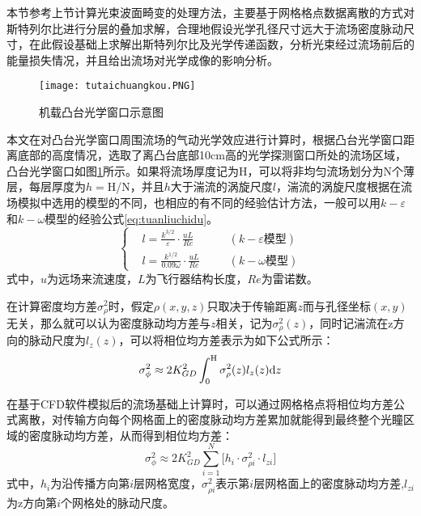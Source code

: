 本节参考上节计算光束波面畸变的处理方法，主要基于网格格点数据离散的方式对斯特列尔比进行分层的叠加求解，合理地假设光学孔径尺寸远大于流场密度脉动尺寸，在此假设基础上求解出斯特列尔比及光学传递函数，分析光束经过流场前后的能量损失情况，并且给出流场对光学成像的影响分析。

\begin{figure}[bhtp]
\centering
\texttt{[image: tutaichuangkou.PNG]}
\caption{机载凸台光学窗口示意图}
\label{fig:guangxuechaungkou}
\end{figure}

本文在对凸台光学窗口周围流场的气动光学效应进行计算时，根据凸台光学窗口距离底部的高度情况，选取了离凸台底部10cm高的光学探测窗口所处的流场区域，凸台光学窗口如图\ref{fig:guangxuechaungkou}所示。如果将流场厚度记为H，可以将非均匀流场划分为N个薄层，每层厚度为$h=$H/N，并且$h$大于湍流的涡旋尺度$l$，湍流的涡旋尺度根据在流场模拟中选用的模型的不同，也相应的有不同的经验估计方法，一般可以用$k-\varepsilon$和$k-\omega$模型的经验公式\eqref{eq:tuanliuchidu}。
\begin{equation}
\left\{
\begin{aligned}
&l=\frac{k^{3/2}}{\varepsilon}\cdot\frac{uL}{Re}~~~~~~~~&(k-\varepsilon\text{模型})\\
&l=\frac{k^{1/2}}{0.09\omega}\cdot\frac{uL}{Re}~~~~~~~~&(k-\omega\text{模型})
\end{aligned}
\right.
\label{eq:tuanliuchidu}
\end{equation}
式中，$u$为远场来流速度，$L$为飞行器结构长度，$Re$为雷诺数。

在计算密度均方差$\sigma_\rho^2$时，假定$\rho(x,y,z)$只取决于传输距离$z$而与孔径坐标$(x,y)$无关，那么就可以认为密度脉动均方差与$z$相关，记为$\sigma_\rho^2(z)$，同时记湍流在z方向的脉动尺度为$l_z(z)$，可以将相位均方差表示为如下公式所示：
\begin{equation}
\sigma_\phi^2\approx2K_{GD}^2\int_0^{\rm H}\sigma_\rho^2(z)l_z(z)\text{d}z
\end{equation}

在基于CFD软件模拟后的流场基础上计算时，可以通过网格格点将相位均方差公式离散，对传输方向每个网格面上的密度脉动均方差累加就能得到最终整个光瞳区域的密度脉动均方差，从而得到相位均方差：
\begin{equation}
\sigma_\phi^2\approx2K_{GD}^2\sum\limits_{i=1}^{N}\big[h_i\cdot\sigma_{\rho i}^2\cdot l_{zi}\big]
\label{eq:lisanxiangweimaidong}
\end{equation}
式中，$h_i$为沿传播方向第$i$层网格宽度，$\sigma_{\rho i}^2$表示第$i$层网格面上的密度脉动均方差,$l_{zi}$为z方向第$i$个网格处的脉动尺度。

